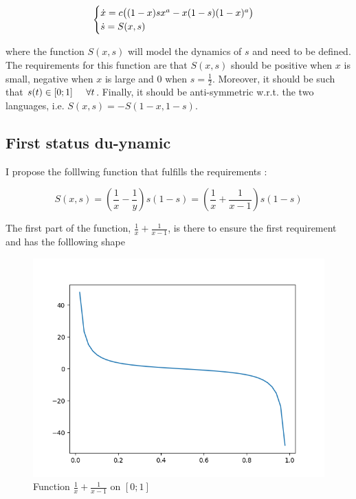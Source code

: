 \documentclass{article}
\begin{document}
\begin{equation}
\label{eq:1dtemp}
\begin{cases}
\dot{x} = c\big( (1-x)sx^a - x(1-s)(1-x)^a \big) \\
\dot{s} = S(x, s) \\
\end{cases}
\end{equation}

where the function $S(x,s)$ will model the dynamics of $s$ and need to be defined.
The requirements for this function are that $S(x,s)$ should be positive when $x$ is small, negative when $x$ is large and $0$ when $s = \frac{1}{2}$.
Moreover, it should be such that $s(t) \in [0;1] \hspace{0.5cm} \forall{t}$.
Finally, it should be anti-symmetric w.r.t. the two languages, i.e. $S(x,s) = - S(1-x, 1-s)$.

\subsection*{First status du-ynamic}

I propose the folllwing function that fulfills the requirements :

\begin{equation}
\label{eq:sdyn1}
S(x,s) = (\frac{1}{x}-\frac{1}{y})s(1-s) = (\frac{1}{x}+\frac{1}{x-1})s(1-s)
\end{equation}

The first part of the function, $\frac{1}{x}+\frac{1}{x-1}$, is there to ensure the first requirement and has the folllowing shape

\begin{figure}[H]
\centering
\includegraphics[scale=0.5]{functionofs.png}
\caption{Function $\frac{1}{x}+\frac{1}{x-1}$ on $[0;1]$}
\label{fig:functionofs}
\end{figure}
\end{document}
